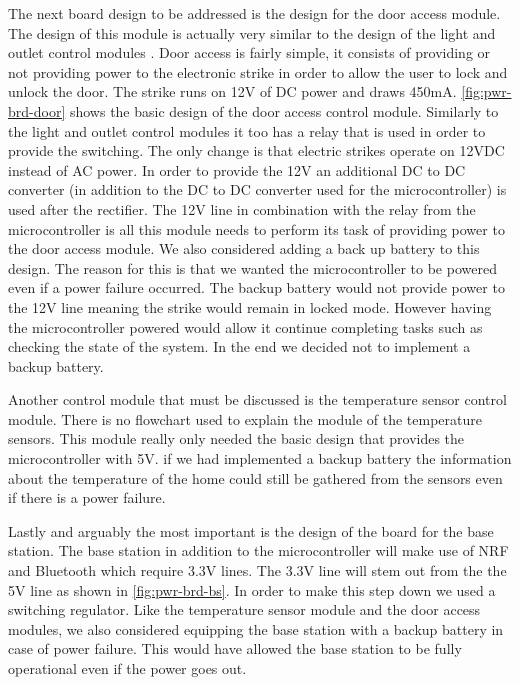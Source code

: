
The next board design to be addressed is the design for the door
access module. The design of this module is actually very similar to the
design of the light and outlet control modules . Door access is fairly
simple, it consists of providing or not providing power to the electronic
strike in order to allow the user to lock and unlock the door. The strike
runs on 12V of DC power and draws 450mA. \autoref{fig:pwr-brd-door} shows the
basic design of the door access control module. Similarly to the light and
outlet control modules it too has a relay that is used in order to provide
the switching. The only change is that electric strikes operate on 12VDC
instead of AC power. In order to provide the 12V an additional DC to DC
converter (in addition to the DC to DC converter used for the
microcontroller) is used after the rectifier. The 12V line in combination
with the relay from the microcontroller is all this module needs to perform
its task of providing power to the door access module. We also considered adding a back up battery to this design. 
The reason for this is that we wanted the microcontroller to be powered
even if a power failure occurred. The backup
battery would not provide power to the 12V line meaning the strike would remain
in locked mode. However having the microcontroller powered would allow it
continue completing tasks such as checking the state of the system. In the end we decided not to implement a backup battery. 


Another control module that must be discussed is the temperature
sensor control module. There is no flowchart used to explain the module of
the temperature sensors. This module really only needed the basic design that provides the microcontroller with 5V. if we had implemented a backup battery the
information about the temperature of the home could still be gathered from the
sensors even if there is a power failure.

Lastly and arguably the most important is the design of the
board for the base station. The base station in addition to the
microcontroller will make use of NRF and Bluetooth which require 3.3V lines.
The 3.3V line will stem out from the the 5V line as shown in
\autoref{fig:pwr-brd-bs}. In order to make this step down we used a switching regulator.  Like the temperature sensor module and the door
access modules, we also considered equipping the base station with a backup battery in
case of power failure. This would have allowed the base station to be fully operational
even if the power goes out.

